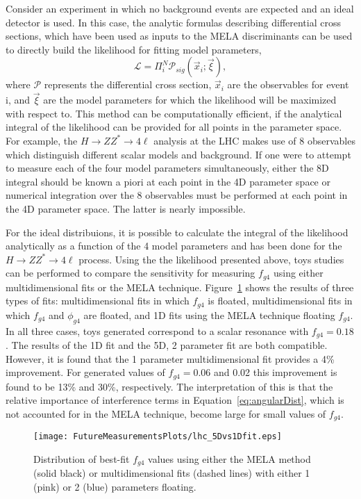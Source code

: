 Consider an experiment in which no background events are expected
and an ideal detector is used.  In this case, the analytic formulas
describing differential cross
sections, which have been used as inputs to the MELA discriminants
can be used to directly build the likelihood for fitting 
model parameters,
\begin{equation}
\mathscr{L}=\Pi^N_i \mathscr{P}_{sig}(\vec{x}_i ; \vec{\xi}),
\end{equation}
where $\mathscr{P}$ represents the differential cross section, 
$\vec{x}_i$ are the observables for event i, and $\vec{\xi}$ 
are the model parameters for which the likelihood will be 
maximized with respect to.
This method can be computationally efficient, if the analytical
integral of the likelihood can be provided for all points in the
parameter space.  For example, the 
$H\to ZZ^*\to4\ell$ analysis at the LHC makes use of 8 observables
which distinguish different scalar models and background.  If one
were to attempt to measure each of the four model parameters
simultaneously,
either the 8D integral should be known a piori at each
point in the 4D parameter space or numerical integration 
over the 8 observables must be performed at each point in the 
4D parameter space.  The latter is nearly impossible.  

For the ideal distribuions, it is possible to calculate the
integral of the likelihood analytically as a function of the
4 model parameters and has been done for the $H\to ZZ^*\to 4\ell$
process.  Using the the likelihood presented above, 
toys studies can be performed to compare the sensitivity for 
measuring $f_{g4}$ using either multidimensional fits or the
MELA technique.  Figure~\ref{fig:fa3MultiDimComp} shows the
results of three 
types of fits: multidimensional fits in which $f_{g4}$ is
floated, multidimensional fits in which $f_{g4}$ and $\phi_{g4}$
are floated, and 1D fits using the MELA technique floating $f_{g4}$.
In all three cases, toys generated correspond to
a scalar resonance with $f_{g4}=0.18$.  The results of the
1D fit and the 5D, 2 parameter fit are both compatible.  However,
it is found that the 1 parameter multidimensional fit provides a
4\% improvement.  For generated
values of $f_{g4}=0.06$ and 0.02 this improvement is found to be
13\% and 30\%, respectively.  The interpretation of this is that
the relative importance of interference terms in Equation~\ref{eq:angularDist},
which is not accounted for in the MELA technique, become large for
small values of $f_{g4}$.

\begin{figure}
\begin{center}
\texttt{[image: FutureMeasurementsPlots/lhc\_5Dvs1Dfit.eps]}
\caption{Distribution of best-fit $f_{g4}$ values using either 
the MELA method (solid black) or multidimensional fits (dashed
lines) with either 1 (pink) or 2 (blue) parameters floating.}
\label{fig:fa3MultiDimComp}
\end{center}
\end{figure}

